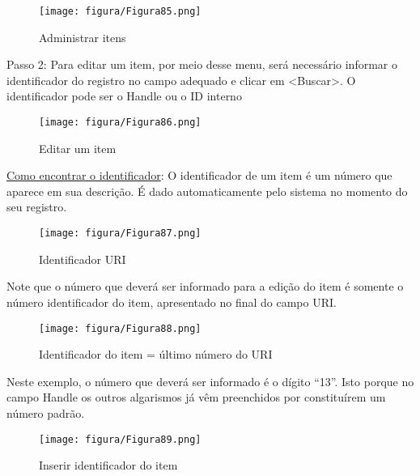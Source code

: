\documentclass[12pt,hidelinks]{article}
\begin{document}
    \begin{figure}[!htp]
                \centering
                \texttt{[image: figura/Figura85.png]}
                \caption{Administrar itens}
            \label{Rotulo}
        \end{figure}
    
    Passo 2: Para editar um item, por meio desse menu, será necessário informar o identificador do registro no campo adequado e clicar em <Buscar>. O identificador pode ser o Handle ou o ID interno
    
    \begin{figure}[!htp]
                \centering
                \texttt{[image: figura/Figura86.png]}
                \caption{Editar um item}
            \label{Rotulo}
        \end{figure}
    
\newpage
    
    \underline{Como encontrar o identificador}: O identificador de um item é um número que aparece em sua descrição. É dado automaticamente pelo sistema no momento do seu registro.
    
    \begin{figure}[!htp]
                \centering
                \texttt{[image: figura/Figura87.png]}
                \caption{Identificador URI}
            \label{Rotulo}
        \end{figure}
    
    Note que o número que deverá ser informado para a edição do item é somente o número identificador do item, apresentado no final do campo URI. 
    
    \begin{figure}[!htp]
                \centering
                \texttt{[image: figura/Figura88.png]}
                \caption{Identificador do item = último número do URI}
            \label{Rotulo}
        \end{figure}

\newpage
    
    Neste exemplo, o número que deverá ser informado é o dígito “13”. Isto porque no campo Handle os outros algarismos já vêm preenchidos por constituírem um número padrão.
    
    \begin{figure}[!htp]
                \centering
                \texttt{[image: figura/Figura89.png]}
                \caption{Inserir identificador do item}
            \label{Rotulo}
        \end{figure}
    
\end{document}
